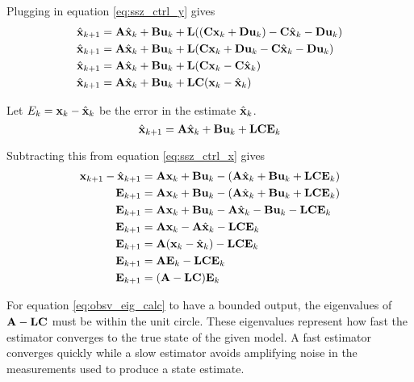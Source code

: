 Plugging in equation \eqref{eq:ssz_ctrl_y} gives
\begin{align*}
  \hat{\mathbf{x}}_{k+1} &= \mathbf{A}\hat{\mathbf{x}}_k + \mathbf{B}\mathbf{u}_k +
    \mathbf{L}((\mathbf{C}\mathbf{x}_k + \mathbf{D}\mathbf{u}_k) - \mathbf{C}\hat{\mathbf{x}}_k -
    \mathbf{D}\mathbf{u}_k) \\
  \hat{\mathbf{x}}_{k+1} &= \mathbf{A}\hat{\mathbf{x}}_k + \mathbf{B}\mathbf{u}_k +
    \mathbf{L}(\mathbf{C}\mathbf{x}_k + \mathbf{D}\mathbf{u}_k - \mathbf{C}\hat{\mathbf{x}}_k -
    \mathbf{D}\mathbf{u}_k) \\
  \hat{\mathbf{x}}_{k+1} &= \mathbf{A}\hat{\mathbf{x}}_k + \mathbf{B}\mathbf{u}_k +
    \mathbf{L}(\mathbf{C}\mathbf{x}_k - \mathbf{C}\hat{\mathbf{x}}_k) \\
  \hat{\mathbf{x}}_{k+1} &= \mathbf{A}\hat{\mathbf{x}}_k + \mathbf{B}\mathbf{u}_k +
    \mathbf{L}\mathbf{C}(\mathbf{x}_k - \hat{\mathbf{x}}_k)
\end{align*}

Let $E_k = \mathbf{x}_k - \hat{\mathbf{x}}_k$ be the \gls{error} in the estimate
$\hat{\mathbf{x}}_k$.
\begin{equation*}
  \hat{\mathbf{x}}_{k+1} = \mathbf{A}\hat{\mathbf{x}}_k + \mathbf{B}\mathbf{u}_k +
    \mathbf{L}\mathbf{C}\mathbf{E}_k
\end{equation*}

Subtracting this from equation \eqref{eq:ssz_ctrl_x} gives
\begin{align}
  \mathbf{x}_{k+1} - \hat{\mathbf{x}}_{k+1} &= \mathbf{A}\mathbf{x}_k + \mathbf{B}\mathbf{u}_k -
    (\mathbf{A}\hat{\mathbf{x}}_k + \mathbf{B}\mathbf{u}_k +
     \mathbf{L}\mathbf{C}\mathbf{E}_k) \nonumber \\
  \mathbf{E}_{k+1} &= \mathbf{A}\mathbf{x}_k + \mathbf{B}\mathbf{u}_k -
    (\mathbf{A}\hat{\mathbf{x}}_k + \mathbf{B}\mathbf{u}_k + \mathbf{L}\mathbf{C}\mathbf{E}_k)
    \nonumber \\
  \mathbf{E}_{k+1} &= \mathbf{A}\mathbf{x}_k + \mathbf{B}\mathbf{u}_k -
    \mathbf{A}\hat{\mathbf{x}}_k - \mathbf{B}\mathbf{u}_k - \mathbf{L}\mathbf{C}\mathbf{E}_k
    \nonumber \\
  \mathbf{E}_{k+1} &= \mathbf{A}\mathbf{x}_k - \mathbf{A}\hat{\mathbf{x}}_k -
    \mathbf{L}\mathbf{C}\mathbf{E}_k \nonumber \\
  \mathbf{E}_{k+1} &= \mathbf{A}(\mathbf{x}_k - \hat{\mathbf{x}}_k) -
    \mathbf{L}\mathbf{C}\mathbf{E}_k \nonumber \\
  \mathbf{E}_{k+1} &= \mathbf{A}\mathbf{E}_k - \mathbf{L}\mathbf{C}\mathbf{E}_k \nonumber \\
  \mathbf{E}_{k+1} &= (\mathbf{A} - \mathbf{L}\mathbf{C})\mathbf{E}_k \label{eq:obsv_eig_calc}
\end{align}

For equation \eqref{eq:obsv_eig_calc} to have a bounded output, the eigenvalues
of $\mathbf{A} - \mathbf{L}\mathbf{C}$ must be within the unit circle. These eigenvalues
represent how fast the estimator converges to the true \gls{state} of the given
\gls{model}. A fast estimator converges quickly while a slow estimator avoids
amplifying noise in the measurements used to produce a \gls{state} estimate.

